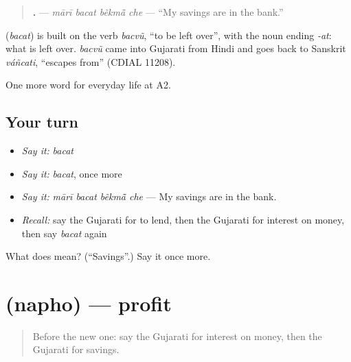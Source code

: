 \begin{quote}
\textbf{   .} — \emph{mārī bacat bẽkmā̃ che} — \textquotedblleft{}My savings are in the bank.\textquotedblright{}
\end{quote}

\begin{cousinweb}
\textbf{} (\emph{bacat}) is built on the verb \emph{bacvũ}, \textquotedblleft{}to be left over\textquotedblright{}, with the noun ending \emph{-at}: what is left over. \emph{bacvũ} came into Gujarati from Hindi and goes back to Sanskrit \emph{váñcati}, \textquotedblleft{}escapes from\textquotedblright{} (CDIAL 11208).
\end{cousinweb}

\begin{grammarlens}[title={What you've built}]
One more word for everyday life at A2.
\end{grammarlens}

\subsection*{Your turn}
\begin{itemize}
\raggedright
  \item \emph{Say it:} \emph{bacat}
  \item \emph{Say it:} \emph{bacat}, once more
  \item \emph{Say it:} \emph{mārī bacat bẽkmā̃ che} — My savings are in the bank.
  \item \emph{Recall:} say the Gujarati for to lend, then the Gujarati for interest on money, then say \emph{bacat} again
\end{itemize}

\begin{tcolorbox}[breakable,colback=teal!4,colframe=teal!35!black,title={Before you move on}]
What does  mean? (\textquotedblleft{}Savings\textquotedblright{}.) Say it once more.
\end{tcolorbox}
\section[\texorpdfstring{\gu{નફો} (napho)}{નફો (napho)}]{ (napho) — profit}

\label{lesson:GU-C191-napho}



\begin{quote}
Before the new one: say the Gujarati for interest on money, then the Gujarati for savings.
\end{quote}

